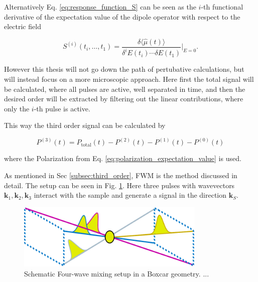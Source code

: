 Alternatively Eq. \eqref{eq:response_function_S} can be seen as the $i$-th functional derivative of the expectation value of the dipole operator with respect to the electric field \cite{mukamel1995principlesnonlinearoptical, cho2009twodimensionalopticalspectroscopy}

\begin{equation}
	S^{(i)}(t_i, \dots, t_1) = \frac{\delta \langle \hat{\mu}(t) \rangle}{\delta^i E(t_i) \cdots \delta E(t_1)}  \bigg|_{E=0}.
	\label{eq:response_function}
\end{equation}

\noindent
However this thesis will not go down the path of pertubative calculations, but will instead focus on a more microscopic approach.
Here first the total signal will be calculated, where all pulses are active, well separated in time, and then the desired order will be extracted by filtering out the linear contributions, where only the $i$-th pulse is active.

This way the third order signal can be calculated by 

\begin{equation}
	P^{(3)}(t) = P_{\text{total}}(t) - P^{(2)}(t) - P^{(1)}(t) - P^{(0)}(t)
\end{equation}

\noindent
where the Polarization from Eq. \eqref{eq:polarization_expectation_value} is used. 

\noindent
As mentioned in Sec \ref{subsec:third_order}, FWM is the method discussed in detail. The setup can be seen in Fig. \ref{fig:fwm_box_car_setup}. Here three pulses with wavevectors $\mathbf{k}_1, \mathbf{k}_2, \mathbf{k}_3$ interact with the sample and generate a signal in the direction $\mathbf{k}_S$. 

\begin{figure}[ht]
	\centering
	\includegraphics[width=0.8\textwidth]{../figures/FWM_scheme.pdf}
	\caption{Schematic Four-wave mixing setup in a Boxcar geometry. ... }
	\label{fig:fwm_box_car_setup}
\end{figure}

